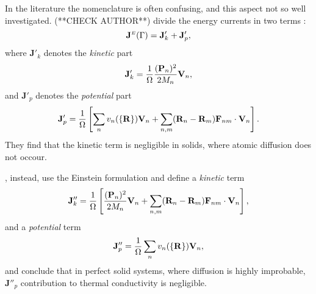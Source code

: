 \begin{LEtext}
In the literature the nomenclature is often confusing, and this aspect not so well investigated. \citeauthor{Vogelsang1987} (**CHECK AUTHOR**) divide the energy currents in two terms \cite{McQuarrie2000}:
\begin{equation}
    \mathbf{J}^{\scriptscriptstyle E}({\mathrm\Gamma}) = \mathbf{J}'_k + \mathbf{J}'_p ,
\end{equation}
where $\mathbf{J}'_k$ denotes the \emph{kinetic} part
\begin{equation}
    \mathbf{J}'_k = \frac{1}{{\mathrm\Omega}} \frac{(\mathbf{P}_n)^2}{2M_n} \mathbf{V}_n ,
\end{equation}
and $\mathbf{J}'_p$ denotes the \emph{potential} part
\begin{equation}
    \mathbf{J}'_p = \frac{1}{{\mathrm\Omega}} \left[ \sum_n  v_n(\{\mathbf{R}\}) \mathbf{V}_n + \sum_{n,m} (\mathbf{R}_n-\mathbf{R}_m) \mathbf{F}_{n m} \cdot \mathbf{V}_n \right] .
\end{equation}
They find that the kinetic term is negligible in solids, where atomic diffusion does not occour.

\citeauthor{Kinaci2012}, instead, use the Einstein formulation and define a \emph{kinetic} term
\begin{equation}
    \mathbf{J}''_k = \frac{1}{{\mathrm\Omega}} \left[ \frac{(\mathbf{P}_n)^2}{2M_n} \mathbf{V}_n + \sum_{n,m} (\mathbf{R}_n-\mathbf{R}_m) \mathbf{F}_{n m} \cdot \mathbf{V}_n \right],
\end{equation}
and a \emph{potential} term
\begin{equation}
    \mathbf{J}''_p = \frac{1}{{\mathrm\Omega}} \sum_n  v_n(\{\mathbf{R}\}) \mathbf{V}_n ,
\end{equation}
and conclude that in perfect solid systems, where diffusion is highly improbable, $\mathbf{J}''_p$ contribution to thermal conductivity is negligible.



\end{LEtext}
